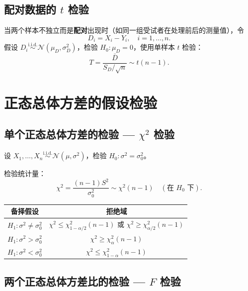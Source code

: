 \subsection{配对数据的 $t$ 检验}

当两个样本不独立而是\textbf{配对}出现时（如同一组受试者在处理前后的测量值），令
\begin{equation}
    D_i = X_i - Y_i,\quad i = 1,\dots,n.
\end{equation}
假设 $D_i \stackrel{\mathrm{i.i.d.}}{\sim} \mathcal{N}(\mu_D, \sigma_D^2)$，检验 $H_0: \mu_D = 0$，使用单样本 $t$ 检验：
\begin{equation}
    T = \frac{\bar{D}}{S_D / \sqrt{n}} \sim t(n-1).
\end{equation}

\section{正态总体方差的假设检验}

\subsection{单个正态总体方差的检验 — $\chi^2$ 检验}

设 $X_1, \dots, X_n \stackrel{\mathrm{i.i.d.}}{\sim} \mathcal{N}(\mu, \sigma^2)$，检验 $H_0: \sigma^2 = \sigma_0^2$。

检验统计量：
\begin{equation}
    \chi^2 = \frac{(n-1)S^2}{\sigma_0^2} \sim \chi^2(n-1) \quad (\text{在 } H_0 \text{ 下}).
\end{equation}

\begin{center}
\begin{tabular}{c|c}
    \toprule
    备择假设 & 拒绝域 \\
    \midrule
    $H_1: \sigma^2 \neq \sigma_0^2$ & $\chi^2 \le \chi^2_{1-\alpha/2}(n-1)$ 或 $\chi^2 \ge \chi^2_{\alpha/2}(n-1)$ \\
    $H_1: \sigma^2 > \sigma_0^2$    & $\chi^2 \ge \chi^2_{\alpha}(n-1)$ \\
    $H_1: \sigma^2 < \sigma_0^2$    & $\chi^2 \le \chi^2_{1-\alpha}(n-1)$ \\
    \bottomrule
\end{tabular}
\end{center}

\subsection{两个正态总体方差比的检验 — $F$ 检验}

